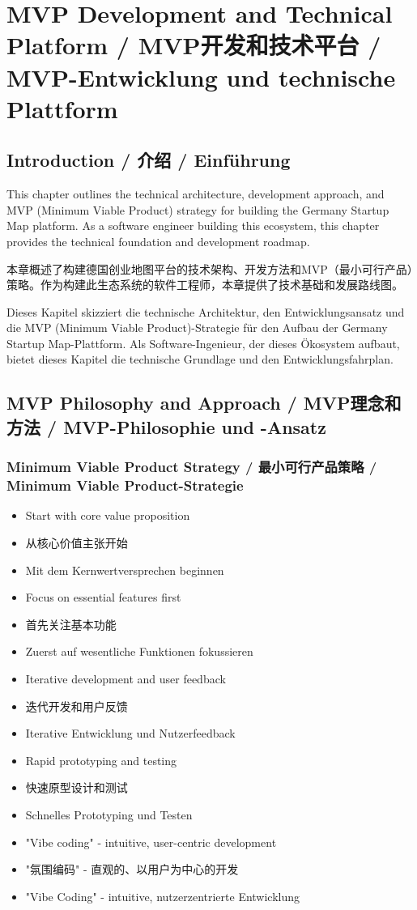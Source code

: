 \chapter{MVP Development and Technical Platform / MVP开发和技术平台 / MVP-Entwicklung und technische Plattform}

\section{Introduction / 介绍 / Einführung}

This chapter outlines the technical architecture, development approach, and MVP (Minimum Viable Product) strategy for building the Germany Startup Map platform. As a software engineer building this ecosystem, this chapter provides the technical foundation and development roadmap.

本章概述了构建德国创业地图平台的技术架构、开发方法和MVP（最小可行产品）策略。作为构建此生态系统的软件工程师，本章提供了技术基础和发展路线图。

Dieses Kapitel skizziert die technische Architektur, den Entwicklungsansatz und die MVP (Minimum Viable Product)-Strategie für den Aufbau der Germany Startup Map-Plattform. Als Software-Ingenieur, der dieses Ökosystem aufbaut, bietet dieses Kapitel die technische Grundlage und den Entwicklungsfahrplan.

\section{MVP Philosophy and Approach / MVP理念和方法 / MVP-Philosophie und -Ansatz}

\subsection{Minimum Viable Product Strategy / 最小可行产品策略 / Minimum Viable Product-Strategie}
\begin{itemize}
    \item Start with core value proposition
    \item 从核心价值主张开始
    \item Mit dem Kernwertversprechen beginnen
    \item Focus on essential features first
    \item 首先关注基本功能
    \item Zuerst auf wesentliche Funktionen fokussieren
    \item Iterative development and user feedback
    \item 迭代开发和用户反馈
    \item Iterative Entwicklung und Nutzerfeedback
    \item Rapid prototyping and testing
    \item 快速原型设计和测试
    \item Schnelles Prototyping und Testen
    \item "Vibe coding" - intuitive, user-centric development
    \item "氛围编码" - 直观的、以用户为中心的开发
    \item "Vibe Coding" - intuitive, nutzerzentrierte Entwicklung
\end{itemize}

